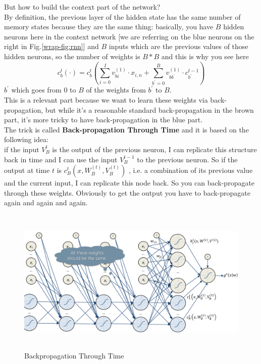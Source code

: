 But how to build the context part of the network? \\
By definition, the previous %
layer of the hidden state has the same number of  memory states because they are the same thing: basically, you have $B$ hidden neurons here in the context network [we are referring on the blue neurons on the right in Fig.\ref{wrap-fig:rnn}] and $B$ inputs which are the previous values of those hidden neurons, so the number of weights is $B*B$ and this is why you see here
$$
c_{b}^{t}(\cdot)=c_{b}^{t}\left(\sum_{i=0}^{I} v_{b i}^{(1)} \cdot x_{i, n}+\sum_{b^{\prime}=0}^{B} v_{b b^{\prime}}^{(1)} \cdot c_{b^{\prime}}^{t-1}\right)
$$
$b^{'}$ which goes from 0 to $B$ of the weights from $b^{'}$ to $B$.\\
This is a relevant part because we want to learn these weights via back-propagation, but while it's a reasonable standard back-propagation in the brown part, it's more tricky to have back-propagation in the blue part.\\ 

The trick is called \textbf{Back-propagation Through Time} and it is based on the following idea: \\
if the input $V_B^t$ is the output of the previous neuron, I can replicate this structure back in time and I can use the input $V_B^{t-1}$ to the previous neuron. So if the output at time $t$ is $
c_{B}^{t}\left(x, W_{B}^{(t)}, V_{B}^{(t)}\right)
$ , i.e. a combination of its previous value and the current input, I can replicate this node back.
So you can back-propagate through these weights. Obviously to get the output you have to back-propagate again and again and again. \\
\begin{figure}
    \centering
    \includegraphics[width=15cm, height=7cm]{images/rnn_backpropagation.png}
    \caption{Backpropagation Through Time}
    \label{fig:rnn_back}
\end{figure}{}

